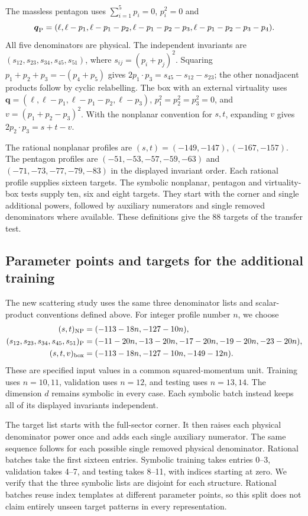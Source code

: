 The massless pentagon uses $\sum_{i=1}^5p_i=0$, $p_i^2=0$ and
\begin{equation}
 \boldsymbol q_{\rm P}=(\ell,\ell-p_1,\ell-p_1-p_2,
 \ell-p_1-p_2-p_3,\ell-p_1-p_2-p_3-p_4).
\end{equation}
All five denominators are physical. The independent invariants are $(s_{12},s_{23},s_{34},s_{45},s_{51})$, where $s_{ij}=(p_i+p_j)^2$. Squaring $p_1+p_2+p_3=-(p_4+p_5)$ gives $2p_1\cdot p_3=s_{45}-s_{12}-s_{23}$; the other nonadjacent products follow by cyclic relabelling. The box with an external virtuality uses $\boldsymbol q=(\ell,\ell-p_1,\ell-p_1-p_2,\ell-p_3)$, $p_1^2=p_2^2=p_3^2=0$, and $v=(p_1+p_2-p_3)^2$. With the nonplanar convention for $s,t$, expanding $v$ gives $2p_2\cdot p_3=s+t-v$.

The rational nonplanar profiles are $(s,t)=(-149,-147),(-167,-157)$. The pentagon profiles are $(-51,-53,-57,-59,-63)$ and $(-71,-73,-77,-79,-83)$ in the displayed invariant order. Each rational profile supplies sixteen targets. The symbolic nonplanar, pentagon and virtuality-box tests supply ten, six and eight targets. They start with the corner and single additional powers, followed by auxiliary numerators and single removed denominators where available. These definitions give the 88 targets of the transfer test.

\subsection{Parameter points and targets for the additional training}
The new scattering study uses the same three denominator lists and scalar-product conventions defined above. For integer profile number $n$, we choose
\begin{align}
 (s,t)_{\rm NP}&=(-113-18n,-127-10n),\\
 (s_{12},s_{23},s_{34},s_{45},s_{51})_{\rm P}
 &=(-11-20n,-13-20n,-17-20n,-19-20n,-23-20n),\\
 (s,t,v)_{\rm box}&=(-113-18n,-127-10n,-149-12n).
\end{align}
These are specified input values in a common squared-momentum unit. Training uses $n=10,11$, validation uses $n=12$, and testing uses $n=13,14$. The dimension $d$ remains symbolic in every case. Each symbolic batch instead keeps all of its displayed invariants independent.

The target list starts with the full-sector corner. It then raises each physical denominator power once and adds each single auxiliary numerator. The same sequence follows for each possible single removed physical denominator. Rational batches take the first sixteen entries. Symbolic training takes entries 0--3, validation takes 4--7, and testing takes 8--11, with indices starting at zero. We verify that the three symbolic lists are disjoint for each structure. Rational batches reuse index templates at different parameter points, so this split does not claim entirely unseen target patterns in every representation.

